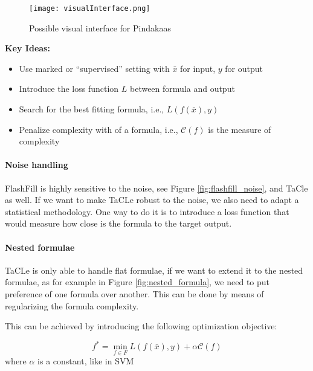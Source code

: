 \begin{figure}[htb]
 \centering
 \texttt{[image: visualInterface.png]}
 \caption{Possible visual interface for Pindakaas}
  \label{fig:visual_interface}
\end{figure}

\textbf{Key Ideas:}
  \begin{itemize}
    \item Use marked or ``supervised'' setting with $\bar x$ for input, $y$ for output
    \item Introduce the loss function $L$ between formula and output
    \item Search for the best fitting formula, i.e., $L(f(\bar x),y)$
    \item Penalize complexity with of a formula, i.e., $\mathcal{C}(f)$ is the measure of complexity
  \end{itemize}




\paragraph{Noise handling} FlashFill is highly sensitive to the noise,
see Figure \ref{fig:flashfill_noise},
and TaCle as well. If we want to make TaCLe robust to the noise, we also need to adapt a
statistical methodology. One way to do it is to introduce a loss
function that would measure how close is the formula to the target
output.

\paragraph{Nested formulae} TaCLe is only able to handle flat
formulae, if we want to extend it to the nested formulae, as for
example in Figure \ref{fig:nested_formula}, we need to
put preference of one formula over another. This can be done by means
of regularizing the formula complexity.

This can be achieved by introducing the following optimization
objective:

  \begin{equation*}
    f^* = \min_{f \in F}{L(f(\bar x),y) + \alpha \mathcal{C}(f)}
  \end{equation*}
  where $\alpha$ is a constant, like in SVM

